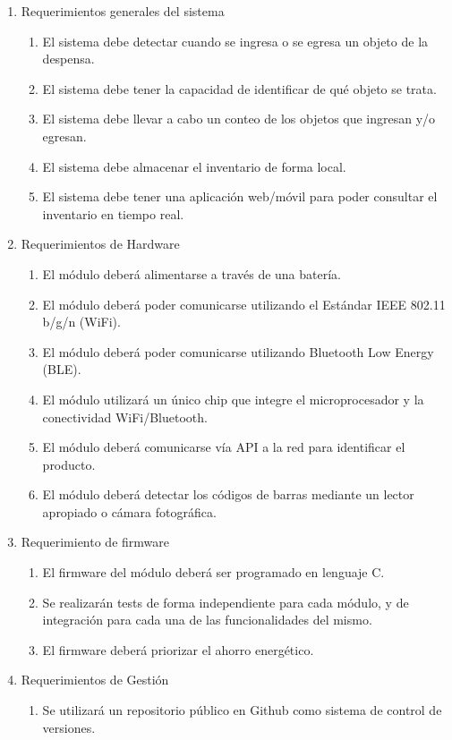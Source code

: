 \documentclass[
11pt, %
codirector, %
]{charter}
\begin{document}
\begin{enumerate}
	\item Requerimientos generales del sistema
		\begin{enumerate}
			\item El sistema debe detectar cuando se ingresa o se egresa un objeto de la despensa.
			\item El sistema debe tener la capacidad de identificar de qué objeto se trata.
			\item El sistema debe llevar a cabo un conteo de los objetos que ingresan y/o egresan.
    \item El sistema debe almacenar el inventario de forma local.
    \item El sistema debe tener una aplicación web/móvil para poder consultar el inventario en tiempo real.
           
		\end{enumerate}
	\item Requerimientos de Hardware
		\begin{enumerate}
			 \item El módulo deberá alimentarse a través de una batería.
			\item El módulo deberá poder comunicarse utilizando el Estándar IEEE 802.11 b/g/n
(WiFi).
            \item El módulo deberá poder comunicarse utilizando Bluetooth Low Energy (BLE).
            \item El módulo utilizará un único chip que integre el microprocesador y la conectividad WiFi/Bluetooth.
            \item El módulo deberá comunicarse vía API a la red para identificar el producto.
            \item El módulo deberá detectar los códigos de barras mediante un lector apropiado o cámara fotográfica.
		\end{enumerate}
	\item Requerimiento de firmware
         \begin{enumerate}
            \item El firmware del módulo deberá ser programado en lenguaje C.
            \item Se realizarán tests de forma independiente para cada módulo, y de integración para cada una de las funcionalidades del mismo.
            \item El firmware deberá priorizar el ahorro energético. 
         \end{enumerate}
	\item Requerimientos de Gestión
        \begin{enumerate}
            \item Se utilizará un repositorio público en Github como sistema de control de versiones.
         \end{enumerate}
	
\end{enumerate}
\end{document}
